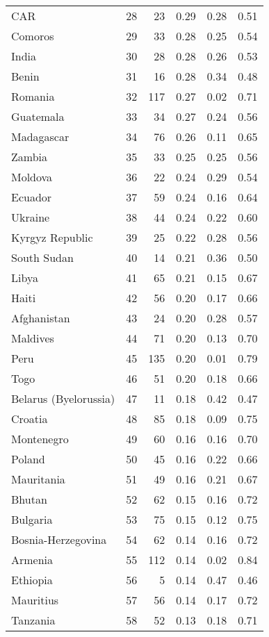 \begin{longtable}[t]{lrrrrr}
CAR & 28 & 23 & 0.29 & 0.28 & 0.51\\
Comoros & 29 & 33 & 0.28 & 0.25 & 0.54\\
India & 30 & 28 & 0.28 & 0.26 & 0.53\\
\addlinespace
Benin & 31 & 16 & 0.28 & 0.34 & 0.48\\
Romania & 32 & 117 & 0.27 & 0.02 & 0.71\\
Guatemala & 33 & 34 & 0.27 & 0.24 & 0.56\\
Madagascar & 34 & 76 & 0.26 & 0.11 & 0.65\\
Zambia & 35 & 33 & 0.25 & 0.25 & 0.56\\
\addlinespace
Moldova & 36 & 22 & 0.24 & 0.29 & 0.54\\
Ecuador & 37 & 59 & 0.24 & 0.16 & 0.64\\
Ukraine & 38 & 44 & 0.24 & 0.22 & 0.60\\
Kyrgyz Republic & 39 & 25 & 0.22 & 0.28 & 0.56\\
South Sudan & 40 & 14 & 0.21 & 0.36 & 0.50\\
\addlinespace
Libya & 41 & 65 & 0.21 & 0.15 & 0.67\\
Haiti & 42 & 56 & 0.20 & 0.17 & 0.66\\
Afghanistan & 43 & 24 & 0.20 & 0.28 & 0.57\\
Maldives & 44 & 71 & 0.20 & 0.13 & 0.70\\
Peru & 45 & 135 & 0.20 & 0.01 & 0.79\\
\addlinespace
Togo & 46 & 51 & 0.20 & 0.18 & 0.66\\
Belarus (Byelorussia) & 47 & 11 & 0.18 & 0.42 & 0.47\\
Croatia & 48 & 85 & 0.18 & 0.09 & 0.75\\
Montenegro & 49 & 60 & 0.16 & 0.16 & 0.70\\
Poland & 50 & 45 & 0.16 & 0.22 & 0.66\\
\addlinespace
Mauritania & 51 & 49 & 0.16 & 0.21 & 0.67\\
Bhutan & 52 & 62 & 0.15 & 0.16 & 0.72\\
Bulgaria & 53 & 75 & 0.15 & 0.12 & 0.75\\
Bosnia-Herzegovina & 54 & 62 & 0.14 & 0.16 & 0.72\\
Armenia & 55 & 112 & 0.14 & 0.02 & 0.84\\
\addlinespace
Ethiopia & 56 & 5 & 0.14 & 0.47 & 0.46\\
Mauritius & 57 & 56 & 0.14 & 0.17 & 0.72\\
Tanzania & 58 & 52 & 0.13 & 0.18 & 0.71\\

\end{longtable}
